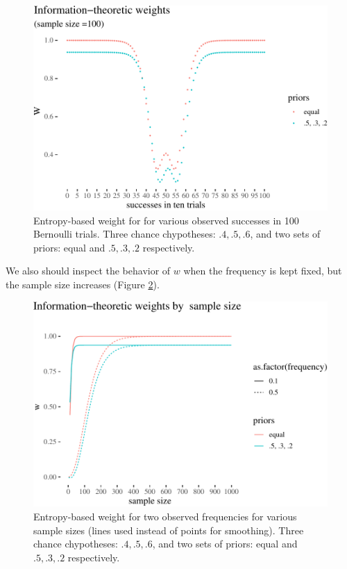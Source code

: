 \documentclass[
  10pt,
  dvipsnames,enabledeprecatedfontcommands]{scrartcl}
\begin{document}
\begin{figure}

\begin{center}\includegraphics[width=1\linewidth]{imprecision_weight_files/figure-latex/entropyJoyceExamplePlot100-1} \end{center}

\caption{Entropy-based weight for for various observed successes in 100 Bernoulli trials. Three chance chypotheses: $.4, .5, .6$, and two sets of priors: equal and $.5, .3, .2$ respectively.}
\label{fig:entropyJoyceExamplePlot}
\end{figure}

We also should inspect the behavior of \(w\) when the frequency is kept
fixed, but the sample size increases (Figure
\ref{fig:entropyJoyceExampleSampleSize}).

\begin{figure}

\begin{center}\includegraphics[width=1\linewidth]{imprecision_weight_files/figure-latex/entropyJoyceExampleSampleSize-1} \end{center}

\caption{Entropy-based weight for two observed frequencies for various sample sizes (lines used instead of points for smoothing). Three chance chypotheses: $.4, .5, .6$, and two sets of priors: equal and $.5, .3, .2$ respectively.}
\label{fig:entropyJoyceExampleSampleSize}
\end{figure}
\end{document}

